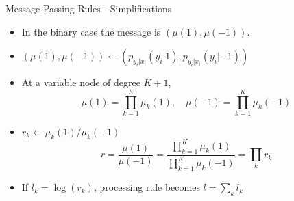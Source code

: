 \documentclass{beamer}
\begin{document}
  \begin{frame}{Message Passing Rules - Simplifications}
  \begin{itemize} \itemsep 0.2cm
  \item In the binary case the message is $\left( \mu(1), \mu(-1)\right)$.
  \item $\left( \mu(1), \mu(-1)\right) \gets \left( p_{y_i|x_i}(y_i|1), p_{y_i|x_i}(y_i|-1)\right)$
  \item At a variable node of degree $K + 1$,
  \begin{equation*}
    \mu(1) = \prod_{k = 1}^K \mu_k(1), \quad \mu(-1) = \prod_{k = 1}^K \mu_k(-1)
    \end{equation*}
  \item $r_k \gets \mu_k(1)/\mu_k(-1)$
  \begin{equation*}
   r = \dfrac{\mu(1)}{\mu(-1)} = \dfrac{\prod_{k = 1}^K \mu_k(1)}{\prod_{k = 1}^K \mu_k(-1)} = \prod_k r_k
  \end{equation*}
  \item If $l_k = \log(r_k)$, processing rule becomes $l = \sum_k l_k$

  \end{itemize}
  \end{frame}
  
\end{document}
